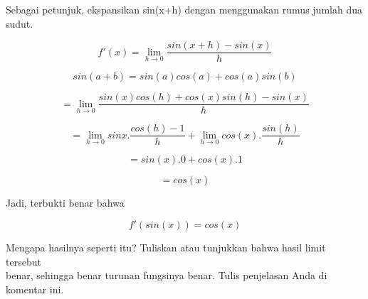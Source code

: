 \documentclass[a4paper,10pt]{article}
\begin{document}
\begin{eulernotebook}
\begin{eulercomment}
Sebagai petunjuk, ekspansikan sin(x+h) dengan menggunakan rumus jumlah
dua sudut.

\end{eulercomment}
\begin{eulercomment}
\end{eulercomment}
\begin{eulerformula}
\[
f'(x) = \lim_{h\to 0} \frac{sin(x+h)-sin(x)}{h}
\]
\end{eulerformula}
\begin{eulercomment}
\end{eulercomment}
\begin{eulerformula}
\[
sin(a+b)=sin(a)cos(a)+cos(a)sin(b)
\]
\end{eulerformula}
\begin{eulercomment}
\end{eulercomment}
\begin{eulerformula}
\[
= \lim_{h\to 0} \frac{sin(x)cos(h)+cos(x)sin(h)-sin(x)}{h}
\]
\end{eulerformula}
\begin{eulercomment}
\end{eulercomment}
\begin{eulerformula}
\[
= \lim_{h\to 0} sinx.\frac{cos(h)-1}{h}+\lim_{h\to 0} cos(x).\frac{sin(h)}{h}
\]
\end{eulerformula}
\begin{eulerformula}
\[
= sin(x).0+cos(x).1
\]
\end{eulerformula}
\begin{eulercomment}
\end{eulercomment}
\begin{eulerformula}
\[
= cos(x)
\]
\end{eulerformula}
\begin{eulercomment}
Jadi, terbukti benar bahwa

\end{eulercomment}
\begin{eulerformula}
\[
f'(sin(x)) = cos(x)
\]
\end{eulerformula}
\eulersubheading{}
\begin{eulercomment}
Mengapa hasilnya seperti itu? Tuliskan atau tunjukkan bahwa hasil
limit tersebut\\
benar, sehingga benar turunan fungsinya benar.  Tulis penjelasan Anda
di komentar ini.


\end{eulercomment}
\end{eulernotebook}
\end{document}
